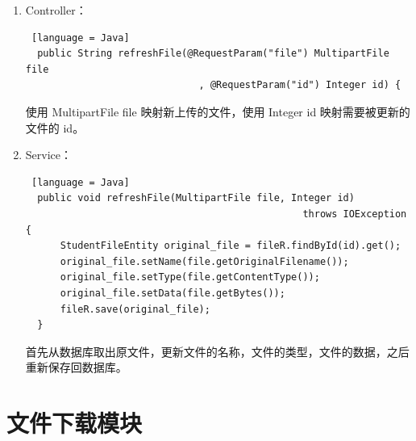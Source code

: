 \begin{enumerate}
  \item Controller：
        \begin{lstlisting} [language = Java]
  public String refreshFile(@RequestParam("file") MultipartFile file
                              , @RequestParam("id") Integer id) {
  \end{lstlisting}
        使用 MultipartFile file 映射新上传的文件，使用 Integer id 映射需要被更新的文件的 id。
  \item Service：
        \begin{lstlisting} [language = Java]
  public void refreshFile(MultipartFile file, Integer id) 
                                                throws IOException {
      StudentFileEntity original_file = fileR.findById(id).get();
      original_file.setName(file.getOriginalFilename());
      original_file.setType(file.getContentType());
      original_file.setData(file.getBytes());
      fileR.save(original_file);
  }
  \end{lstlisting}
        首先从数据库取出原文件，更新文件的名称，文件的类型，文件的数据，之后重新保存回数据库。
\end{enumerate}

\section{文件下载模块}

